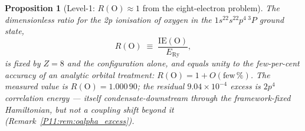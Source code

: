 \documentclass[11pt,a4paper]{article}
\newtheorem{proposition}[theorem]{Proposition}
\theoremstyle{definition}
\theoremstyle{remark}
\newcommand{\ERy}{E_{\mathrm{Ry}}}
\newcommand{\IE}{\mathrm{IE}}
\begin{document}
\begin{proposition}[Level-1: $R(\mathrm{O})\approx1$ from the eight-electron problem]
\label{P11:prop:R_equals_1}
The dimensionless ratio for the 2p ionisation of oxygen in the
$1s^22s^22p^4\,{}^3P$ ground state,
\begin{equation}
  R(\mathrm{O}) \;\equiv\; \frac{\IE(\mathrm{O})}{\ERy},
  \label{P11:eq:R_equals_1}
\end{equation}
is fixed by $Z=8$ and the configuration alone, and equals unity to the
few-per-cent accuracy of an analytic orbital treatment:
$\boxed{R(\mathrm{O}) = 1 + O(\text{few}\,\%)}$.  The measured value is
$R(\mathrm{O}) = 1.000\,90$; the residual $9.04\times10^{-4}$ excess is
$2p^4$ correlation energy --- itself condensate-downstream through the
framework-fixed Hamiltonian, but not a coupling shift beyond it
(Remark~\ref{P11:rem:oalpha_excess}).
\end{proposition}
\end{document}
